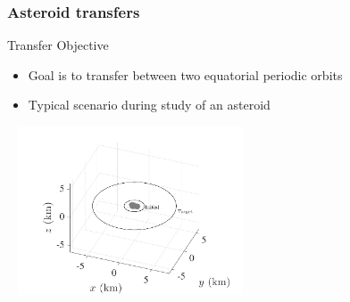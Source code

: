 \subsubsection[4769 Castalia]{Asteroid transfers}

\begin{frame}{Transfer Objective}\label{slide:asteroid_transfer} %

\begin{itemize}
    \item Goal is to transfer between two equatorial periodic orbits
    \item Typical scenario during study of an asteroid~\hyperlink{slide:polyhedron_gravity}{}
\end{itemize}

\begin{center}
    ~\hfill
    \includegraphics[width=0.5\textwidth,height=0.7\textheight,keepaspectratio]{figures/2016AAS/initial_transfer_3d.pdf}
\end{center}

\end{frame}%

